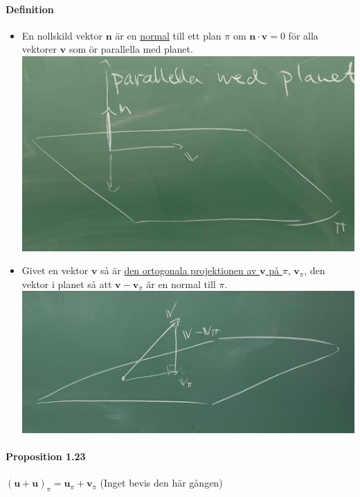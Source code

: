     \paragraph{Definition} \begin{itemize}
        \item En nollskild vektor $\bm{n}$ är en \underline{normal} till ett plan $\pi$ om $\bm{n}\cdot \bm{v} = 0$ för alla vektorer $\bm{v}$ som ör parallella med planet.\\
              \includegraphics[scale=0.15]{imgs/22-01-20-img06.jpg}
        \item Givet en vektor $\bm{v}$ så är \underline{den ortogonala projektionen av $\bm{v}$ på $\pi$}, $\bm{v}_{\pi}$, den vektor i planet så att $\bm{v}-\bm{v}_{\pi}$ är en normal till $\pi$.\\
              \includegraphics[scale=0.15]{imgs/22-01-20-img07.jpg}
    \end{itemize}

    \paragraph{Proposition 1.23} $(\bm{u} + \bm{u})_{\pi}=\bm{u}_{\pi} + \bm{v}_{\pi}$ (Inget bevis den här gången)
    \clearpage
